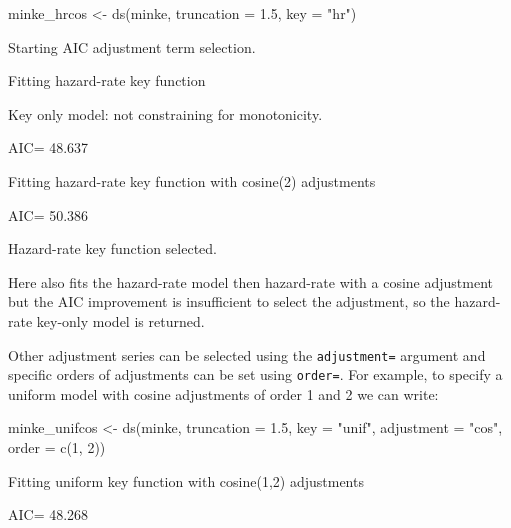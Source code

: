 \documentclass[article,shortnames]{jss}
\begin{document}
\begin{CodeChunk}
\begin{CodeInput}
minke_hrcos <- ds(minke, truncation = 1.5, key = "hr")
\end{CodeInput}
\begin{CodeOutput}
Starting AIC adjustment term selection.
\end{CodeOutput}
\begin{CodeOutput}
Fitting hazard-rate key function
\end{CodeOutput}
\begin{CodeOutput}
Key only model: not constraining for monotonicity.
\end{CodeOutput}
\begin{CodeOutput}
AIC= 48.637
\end{CodeOutput}
\begin{CodeOutput}
Fitting hazard-rate key function with cosine(2) adjustments
\end{CodeOutput}
\begin{CodeOutput}
AIC= 50.386
\end{CodeOutput}
\begin{CodeOutput}

Hazard-rate key function selected.
\end{CodeOutput}
\end{CodeChunk}

Here  also fits the hazard-rate model then hazard-rate with a
cosine adjustment but the AIC improvement is insufficient to select the
adjustment, so the hazard-rate key-only model is returned.

Other adjustment series can be selected using the \texttt{adjustment=}
argument and specific orders of adjustments can be set using
\texttt{order=}. For example, to specify a uniform model with cosine
adjustments of order 1 and 2 we can write:

\begin{CodeChunk}
\begin{CodeInput}
minke_unifcos <- ds(minke, truncation = 1.5, key = "unif",
                    adjustment = "cos", order = c(1, 2))
\end{CodeInput}
\begin{CodeOutput}
Fitting uniform key function with cosine(1,2) adjustments
\end{CodeOutput}
\begin{CodeOutput}
AIC= 48.268
\end{CodeOutput}
\end{CodeChunk}
\end{document}
